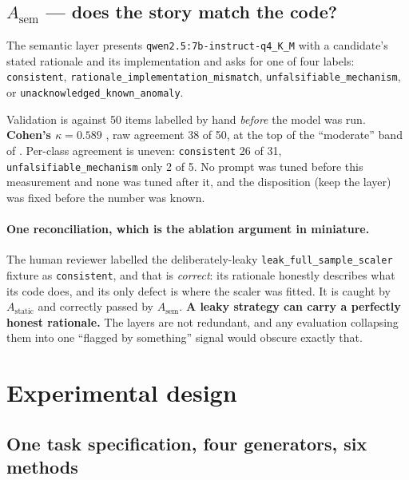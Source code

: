\documentclass[11pt,a4paper]{article}
\begin{document}
\subsection{$A_{\mathrm{sem}}$ --- does the story match the code?}

The semantic layer presents \texttt{qwen2.5:7b-instruct-q4\_K\_M} with a candidate's stated
rationale and its implementation and asks for one of four labels: \texttt{consistent},
\texttt{rationale\_\allowbreak implementation\_\allowbreak mismatch},
\texttt{unfalsifiable\_\allowbreak mechanism}, or
\texttt{unacknowledged\_\allowbreak known\_\allowbreak anomaly}.

Validation is against 50 items labelled by hand \emph{before} the model was run.
\textbf{Cohen's $\kappa = 0.589$} \citep{cohen1960}, raw agreement 38 of 50, at the top of the
``moderate'' band of \citet{landis1977}. Per-class agreement is uneven: \texttt{consistent} 26 of
31, \texttt{unfalsifiable\_mechanism} only 2 of 5. No prompt was tuned before this measurement and
none was tuned after it, and the disposition (keep the layer) was fixed before the number
was known.

\paragraph{One reconciliation, which is the ablation argument in miniature.} The human reviewer
labelled the deliberately-leaky \texttt{leak\_full\_sample\_scaler} fixture as
\texttt{consistent}, and that is \emph{correct}: its rationale honestly describes what its code
does, and its only defect is where the scaler was fitted. It is caught by $A_{\mathrm{static}}$
and correctly passed by $A_{\mathrm{sem}}$. \textbf{A leaky strategy can carry a perfectly honest
rationale.} The layers are not redundant, and any evaluation collapsing them into one ``flagged by
something'' signal would obscure exactly that.

\section{Experimental design}
\label{sec:design}

\subsection{One task specification, four generators, six methods}
\end{document}
